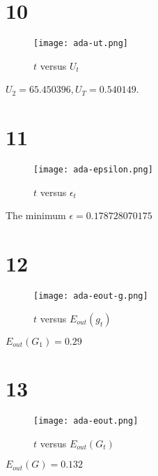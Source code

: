 \documentclass[fleqn,a4paper,12pt]{article}
\begin{document}
\section*{10}

\begin{figure}[H]
\centering
\texttt{[image: ada-ut.png]}
\caption{$t$ versus $U_t$}
\label{fig:ada-ut}
\end{figure}

$U_2 = 65.450396, U_T = 0.540149$.

\section*{11}

\begin{figure}[H]
\centering
\texttt{[image: ada-epsilon.png]}
\caption{$t$ versus $\epsilon_t$}
\label{fig:ada-ut}
\end{figure}

The minimum $\epsilon = 0.178728070175$


\section*{12}

\begin{figure}[H]
\centering
\texttt{[image: ada-eout-g.png]}
\caption{$t$ versus $E_{out}(g_t)$}
\label{fig:ada-eout-g}
\end{figure}

$E_{out}(G_1) = 0.29$

\section*{13}

\begin{figure}[H]
\centering
\texttt{[image: ada-eout.png]}
\caption{$t$ versus $E_{out}(G_t)$}
\label{fig:ada-eout}
\end{figure}

$E_{out}(G) = 0.132$
\end{document}
